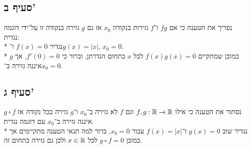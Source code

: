 \subsection{סעיף ב'}
נפריך את הטענה כי אם $fg$ ו־$f$ גזירות בנקודה $x_0$ אז גם $g$ גזירה בנקודה זו על־ידי דוגמה נגדית: \\*
נגדיר $f(x) = 0$ ו־$g(x) = |x|$, $x_0 = 0$. \\*
כמובן שמתקיים $f(x) g(x) = 0$ לכל $x$ בתחום הגדרתן, וברור כי $f'(0) = 0$, אך $g$ איננה גזירה ב־$x_0 = 0$.

\subsection{סעיף ג'}
נסתור את הטענה כי אילו $f, g : \mathbb{R} \rightarrow \mathbb{R}$ וגם $f$ לא גזירה ב־$x_0$ ו־$g$ גזירה בכל נקודה אז $g \circ f$ איננה גזירה ב־$x_0$ עם דוגמה נגדית. \\*
נגדיר שוב $g(x) = 0$ ו־$f(x) = |x|$ עבור $x_0 = 0$. ברור למה תנאי הטענה מתקיימים אך כמובן $g \circ f = 0$ לכל $x \in \mathbb{R}$ ולכן גם גזירה בתחום זה.


